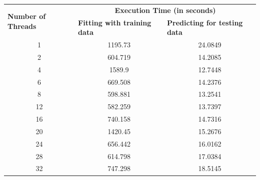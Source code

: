 \documentclass{article}
\begin{document}
	\begin{table}[!htbp]
	\begin{tabular}{|c|c|c|}
	\hline
	\multicolumn{1}{|l|}{\multirow{2}{*}{\textbf{Number of Threads}}} & \multicolumn{2}{c|}{\textbf{Execution Time (in seconds)}}                                                            \\ \cline{2-3} 
	\multicolumn{1}{|l|}{}                                            & \multicolumn{1}{l|}{\textbf{Fitting with training data}} & \multicolumn{1}{l|}{\textbf{Predicting for testing data}} \\ \hline
	1                                                                 & 1195.73                                                  & 24.0849                                                   \\ \hline
	2                                                                 & 604.719                                                  & 14.2085                                                   \\ \hline
	4                                                                 & 1589.9                                                   & 12.7448                                                   \\ \hline
	6                                                                 & 669.508                                                  & 14.2376                                                   \\ \hline
	8                                                                 & 598.881                                                  & 13.2541                                                   \\ \hline
	12                                                                & 582.259                                                  & 13.7397                                                   \\ \hline
	16                                                                & 740.158                                                  & 14.7316                                                   \\ \hline
	20                                                                & 1420.45                                                  & 15.2676                                                   \\ \hline
	24                                                                & 656.442                                                  & 16.0162                                                   \\ \hline
	28                                                                & 614.798                                                  & 17.0384                                                   \\ \hline
	32                                                                & 747.298                                                  & 18.5145                                                   \\ \hline
	\end{tabular}
	\end{table}
	
\end{document}
